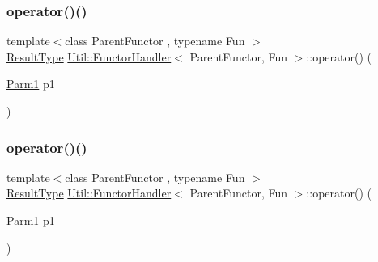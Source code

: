 \mbox{\label{classUtil_1_1FunctorHandler_a38485a110bfa7b2fdb5e34553d2f7264}} 
\subsubsection{\texorpdfstring{operator()()}{operator()()}\hspace{0.1cm}{\footnotesize\ttfamily [5/18]}}
{\footnotesize\ttfamily template$<$class Parent\+Functor , typename Fun $>$ \\
\mbox{\hyperlink{classUtil_1_1FunctorHandler_a036da44b8cc2567704cebd2a20d16c80}{Result\+Type}} \mbox{\hyperlink{classUtil_1_1FunctorHandler}{Util\+::\+Functor\+Handler}}$<$ Parent\+Functor, Fun $>$\+::operator() (\begin{DoxyParamCaption}\item[{\mbox{\hyperlink{classUtil_1_1FunctorHandler_a0a902ba40a0ab746f1c29a81d68ae0db}{Parm1}}}]{p1 }\end{DoxyParamCaption})\hspace{0.3cm}{\ttfamily [inline]}}

\mbox{\label{classUtil_1_1FunctorHandler_a38485a110bfa7b2fdb5e34553d2f7264}} 
\subsubsection{\texorpdfstring{operator()()}{operator()()}\hspace{0.1cm}{\footnotesize\ttfamily [6/18]}}
{\footnotesize\ttfamily template$<$class Parent\+Functor , typename Fun $>$ \\
\mbox{\hyperlink{classUtil_1_1FunctorHandler_a036da44b8cc2567704cebd2a20d16c80}{Result\+Type}} \mbox{\hyperlink{classUtil_1_1FunctorHandler}{Util\+::\+Functor\+Handler}}$<$ Parent\+Functor, Fun $>$\+::operator() (\begin{DoxyParamCaption}\item[{\mbox{\hyperlink{classUtil_1_1FunctorHandler_a0a902ba40a0ab746f1c29a81d68ae0db}{Parm1}}}]{p1 }\end{DoxyParamCaption})\hspace{0.3cm}{\ttfamily [inline]}}

